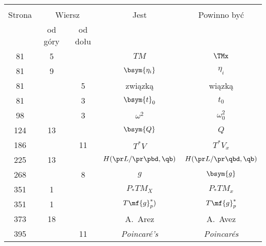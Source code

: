 \documentclass[a4paper,11pt]{article}
\begin{document}

\begin{center}
  \begin{tabular}{|c|c|c|c|c|}
    \hline
    & \multicolumn{2}{c|}{} & & \\
    Strona & \multicolumn{2}{c|}{Wiersz} & Jest
                              & Powinno być \\ \cline{2-3}
    & od góry & od dołu & & \\
    \hline
    81  &  5 & & $TM$ & $\TMx$ \\
    81  &  9 & & $\bsym{ \eta_{ i } }$ & $\eta_{ i }$ \\
    81  & &  5 & związką & wiązką \\
    81  & &  3 & $\bsym{t}_{ 0 }$ & $t_{ 0 }$ \\
    98  & &  3 & $\omega^{ 2 }$ & $\omega_{ 0 }^{ 2 }$ \\
    124 & 13 & & $\bsym{Q}$ & $Q$ \\
    186 & & 11 & $T^{ * }V$ & $T^{ * }V_{ x }$ \\
    225 & 13 & & $H( \pr L / \pr \pbd, \qb )$
           & $H( \pr L / \pr \qbd, \qb )$ \\
    268 & &  8 & $g$ & $\bsym{g}$ \\
    351 &  1 & & $P_{ * }TM_{ X }$ & $P_{ * }TM_{ x }$ \\
    351 &  1 & & $T\mf{g}_{ p }^{ * })$ & $T\mf{g}_{ p }^{ * }$ \\
    373 & 18 & & A.~Arez & A.~Avez \\
    395 & & 11 & \emph{Poincar\'{e}'s} & \emph{Poincar\'{e}s} \\
    \hline
  \end{tabular}
\end{center}

\vspace{\spaceTwo}
\end{document}
